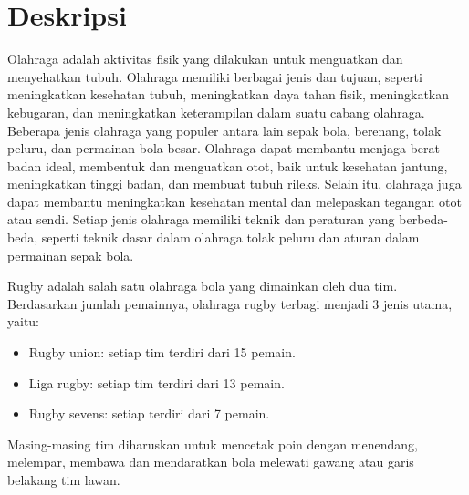 \documentclass[a4paper,twoside]{article}
\begin{document}
\title{\@judultopik}
\author{\nama \textendash \@npm} 

\newcommand{\nama}{Nathanael Adi Trianto}
\newcommand{\@npm}{6181901041}
\newcommand{\@judultopik}{Pembuatan Ulang Aplikasi Rugby Indonesia dengan Ionic 7 dan Capacitor} %
\newcommand{\jumpemb}{1} %
\newcommand{\tanggal}{22/09/2023}


\maketitle


\section{Deskripsi}
Olahraga adalah aktivitas fisik yang dilakukan untuk menguatkan dan menyehatkan tubuh. Olahraga memiliki berbagai jenis dan tujuan, seperti meningkatkan kesehatan tubuh, meningkatkan daya tahan fisik, meningkatkan kebugaran, dan meningkatkan keterampilan dalam suatu cabang olahraga. Beberapa jenis olahraga yang populer antara lain sepak bola, berenang, tolak peluru, dan permainan bola besar. Olahraga dapat membantu menjaga berat badan ideal, membentuk dan menguatkan otot, baik untuk kesehatan jantung, meningkatkan tinggi badan, dan membuat tubuh rileks. Selain itu, olahraga juga dapat membantu meningkatkan kesehatan mental dan melepaskan tegangan otot atau sendi. Setiap jenis olahraga memiliki teknik dan peraturan yang berbeda-beda, seperti teknik dasar dalam olahraga tolak peluru dan aturan dalam permainan sepak bola.

Rugby adalah salah satu olahraga bola yang dimainkan oleh dua tim. Berdasarkan jumlah pemainnya, olahraga rugby terbagi menjadi 3 jenis utama, yaitu:

\begin{itemize}
    \item Rugby union: setiap tim terdiri dari 15 pemain.
    \item Liga rugby: setiap tim terdiri dari 13 pemain.
    \item Rugby sevens: setiap terdiri dari 7 pemain.
\end{itemize}

Masing-masing tim diharuskan untuk mencetak poin dengan menendang, melempar, membawa dan mendaratkan bola melewati gawang atau garis belakang tim lawan.
\end{document}
